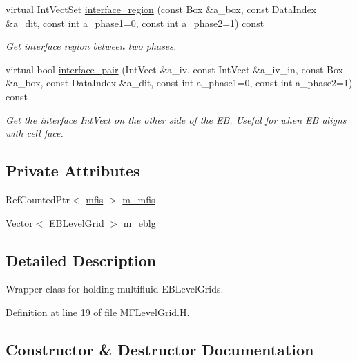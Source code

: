\begin{DoxyCompactItemize}
virtual Int\+Vect\+Set \hyperlink{classMFLevelGrid_a5f4ddfdb106fe19ef30e045c488181b8}{interface\+\_\+region} (const Box \&a\+\_\+box, const Data\+Index \&a\+\_\+dit, const int a\+\_\+phase1=0, const int a\+\_\+phase2=1) const 
\begin{DoxyCompactList}\small\item\em Get interface region between two phases. \end{DoxyCompactList}\item 
virtual bool \hyperlink{classMFLevelGrid_adac4f13ec2a1e5c866cc034f3a658f82}{interface\+\_\+pair} (Int\+Vect \&a\+\_\+iv, const Int\+Vect \&a\+\_\+iv\+\_\+in, const Box \&a\+\_\+box, const Data\+Index \&a\+\_\+dit, const int a\+\_\+phase1=0, const int a\+\_\+phase2=1) const 
\begin{DoxyCompactList}\small\item\em Get the interface Int\+Vect on the other side of the EB. Useful for when EB aligns with cell face. \end{DoxyCompactList}\end{DoxyCompactItemize}
\subsection*{Private Attributes}
\begin{DoxyCompactItemize}
\item 
Ref\+Counted\+Ptr$<$ \hyperlink{classmfis}{mfis} $>$ \hyperlink{classMFLevelGrid_a236b8cb59955d47b72138d7a7c752f3c}{m\+\_\+mfis}
\item 
Vector$<$ E\+B\+Level\+Grid $>$ \hyperlink{classMFLevelGrid_ac3adaee76caee008f240f1088422691b}{m\+\_\+eblg}
\end{DoxyCompactItemize}


\subsection{Detailed Description}
Wrapper class for holding multifluid E\+B\+Level\+Grids. 

Definition at line 19 of file M\+F\+Level\+Grid.\+H.



\subsection{Constructor \& Destructor Documentation}
